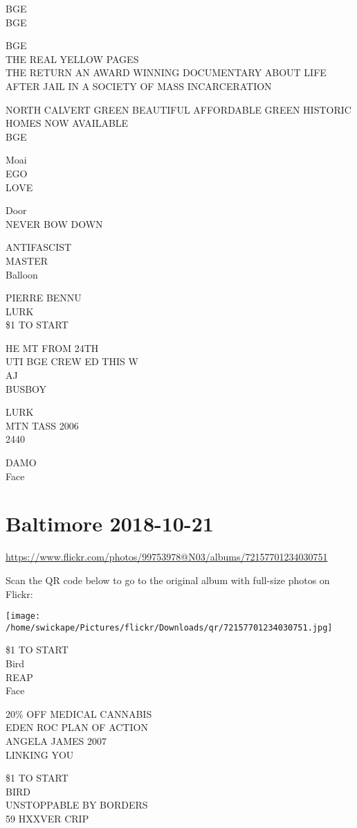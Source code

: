 \documentclass[10pt,letterpaper]{article}
\begin{document}
BGE\\
BGE

BGE\\
THE REAL YELLOW PAGES\\
THE RETURN AN AWARD WINNING DOCUMENTARY ABOUT LIFE AFTER JAIL IN A SOCIETY OF MASS INCARCERATION

NORTH CALVERT GREEN BEAUTIFUL AFFORDABLE GREEN HISTORIC HOMES NOW AVAILABLE\\
BGE

Moai\\
EGO\\
LOVE

Door\\
NEVER BOW DOWN

ANTIFASCIST\\
MASTER\\
Balloon

PIERRE BENNU\\
LURK\\
\$1 TO START

HE MT FROM 24TH\\
UTI BGE CREW ED THIS W\\
AJ\\
BUSBOY

LURK\\
MTN TASS 2006\\
2440

DAMO\\
Face
\pagebreak

\section*{Baltimore 2018-10-21}

\url{https://www.flickr.com/photos/99753978@N03/albums/72157701234030751}

Scan the QR code below to go to the original album with full-size photos on Flickr:

\texttt{[image: /home/swickape/Pictures/flickr/Downloads/qr/72157701234030751.jpg]}
\pagebreak

\$1 TO START\\
Bird\\
REAP\\
Face

20\% OFF MEDICAL CANNABIS\\
EDEN ROC PLAN OF ACTION\\
ANGELA JAMES 2007\\
LINKING YOU

\$1 TO START\\
BIRD\\
UNSTOPPABLE BY BORDERS\\
59 HXXVER CRIP
\end{document}
